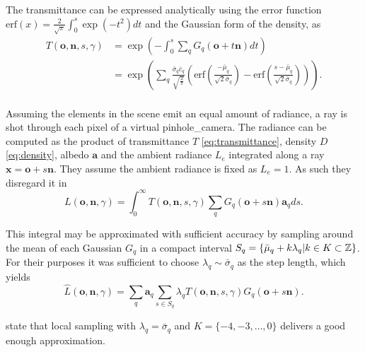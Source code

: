 \documentclass[a4paper, 11pt]{memoir}
\newcommand*{\erf}{\text{erf}}
\begin{document}
    The \gls{transmittance} can be expressed analytically using the error function
    $\erf{(x)} = \frac{2}{\sqrt{\pi}}\int_0^s \exp{(-t^2)} dt$ and the Gaussian form of the density, as
    \begin{equation}
        \begin{aligned}
            T(\mathbf{o}, \mathbf{n}, s, \gamma) &= \exp{\left( -\int_0^s
                \sum_q G_q(\mathbf{o} + t\mathbf{n} ) dt \right)}\\
            &= \exp{\left( \sum_q \frac{\bar{\sigma}_q \bar{c}_q}{\sqrt{\frac{2}{\pi}}}
            \left( \erf{\left( \frac{-\bar{\mu}_q}{\sqrt{2}\bar{\sigma}_q} \right)}
            - \erf{\left( \frac{s - \bar{\mu}_q}{\sqrt{2}\bar{\sigma}_q} \right)} \right) \right)}.\\
        \end{aligned}
        \label{eq:transmittance_analytical}
    \end{equation}

    Assuming the elements in the scene emit an equal amount of \gls{radiance}, a ray is shot through each pixel of a virtual
    \gls{pinhole_camera}. The \gls{radiance} can be computed as the product of \gls{transmittance} $T$ \eqref{eq:transmittance},
    density $D$ \eqref{eq:density}, \gls{albedo} $\mathbf{a}$ and the ambient \gls{radiance} $L_e$ integrated along a ray
    $\mathbf{x} = \mathbf{o} + s\mathbf{n}$. They assume the ambient \gls{radiance} is fixed as $L_e = 1$. As such they
    disregard it in
    \begin{equation}
        L(\mathbf{o}, \mathbf{n}, \gamma) = \int_0^\infty T(\mathbf{o}, \mathbf{n}, s, \gamma)
            \sum_q G_q(\mathbf{o} + s\mathbf{n})\mathbf{a}_q ds.
    \end{equation}
    
    This integral may be approximated with sufficient accuracy by sampling around the mean of each Gaussian $G_q$ in
    a compact interval $S_q = \{ \bar{\mu}_q + k\lambda_q | k \in K \subset \mathbb{Z} \}$. For their purposes it was sufficient
    to choose $\lambda_q \sim \bar{\sigma}_q$ as the step length, which yields
    \begin{equation}
        \hat{L}(\mathbf{o}, \mathbf{n}, \gamma) = \sum_q \mathbf{a}_q \sum_{s \in S_q}
            \lambda_q T(\mathbf{o}, \mathbf{n}, s, \gamma)G_q(\mathbf{o} + s\mathbf{n}).
        \label{eq:radiance}
    \end{equation}

    \citeauthor{Rhodin:2015} state that local sampling with $\lambda_q = \bar{\sigma}_q$ and $K = \{ -4, -3, \dots, 0 \}$
    delivers a good enough approximation.
\end{document}
